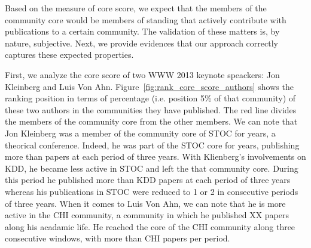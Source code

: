 Based on the measure of core score, we expect that the members of the community core would be members of standing that actively contribute with publications to a certain community.
The validation of these matters is, by nature, subjective.  Next, we provide evidences that our approach correctly captures these expected properties. 

First, we analyze the core score of two WWW 2013 keynote speackers: Jon Kleinberg and Luis Von Ahn.  Figure~\ref{fig:rank_core_score_authors} shows the ranking position in terms of
percentage (i.e. position 5\% of that community) of these two authors in the communities they have published. The red line divides the members of the community core from the other
members. We can note that Jon Kleinberg was a member of the community core of STOC for years, a theorical conference. Indeed, he was part of the STOC core for  years,
publishing more than  papers at each period of three years. With Klienberg's involvements on KDD, he became less active in STOC and left the that community core. During
this period he published more than  KDD papers at each period of three years whereas his publications in STOC were reduced to 1 or 2 in  consecutive periods of
three years. When it comes to Luis Von Ahn, we can note that he is more active in the CHI community, a community in which he published XX papers along his acadamic life. He reached
the core of the CHI community along three consecutive windows, with more than  CHI papers per period. 

